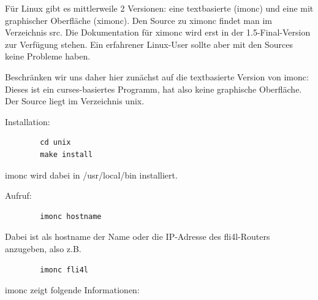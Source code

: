   


  Für Linux gibt es mittlerweile 2 Versionen: eine textbasierte
  (imonc) und eine mit graphischer Oberfläche (ximonc). Den Source zu
  ximonc findet man im Verzeichnis src. Die Dokumentation für ximonc
  wird erst in der 1.5-Final-Version zur Verfügung stehen. Ein
  erfahrener Linux-User sollte aber mit den Sources keine Probleme
  haben.

  Beschränken wir uns daher hier zunächst auf die textbasierte Version
  von imonc: Dieses ist ein curses-basiertes Programm, hat also keine
  graphische Oberfläche. Der Source liegt im Verzeichnis unix.

  Installation:

\begin{example}
\begin{verbatim}
        cd unix
        make install
\end{verbatim}
\end{example}

  imonc wird dabei in /usr/local/bin installiert.

  Aufruf:

\begin{example}
\begin{verbatim}
        imonc hostname
\end{verbatim}
\end{example}

  Dabei ist als hostname der Name oder die IP-Adresse des
  fli4l-Routers anzugeben, also z.B.

\begin{example}
\begin{verbatim}
        imonc fli4l
\end{verbatim}
\end{example}


  imonc zeigt folgende Informationen:

